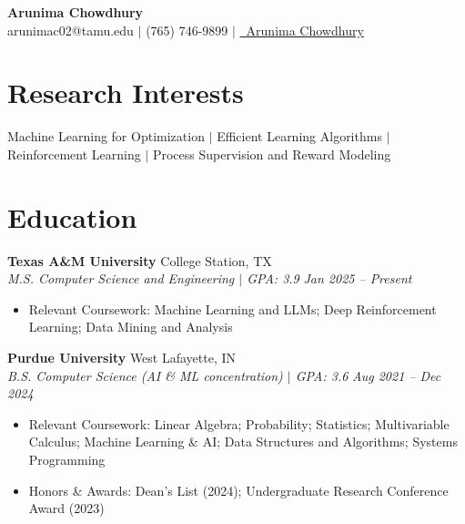 \documentclass[10pt,letterpaper]{article}
\newcommand{\heading}[4]{%
  \noindent\textbf{#1} \hfill #2\\
  \textit{#3} \hfill \textit{#4}\par
}
\begin{document}

\begin{center}
  {\Large \textbf{Arunima Chowdhury}}\\[2pt]
  arunimac02@tamu.edu $|$ (765) 746-9899 $|$
  \href{https://linkedin.com/in/arunima-chowdhury}{\faLinkedin\ Arunima Chowdhury}
\end{center}
\vspace{-8pt}


\section{Research Interests}
Machine Learning for Optimization $|$ Efficient Learning Algorithms $|$ Reinforcement Learning $|$ Process Supervision and Reward Modeling

\section{Education}

\heading{Texas A\&M University}{College Station, TX}{M.S. Computer Science and Engineering $|$ GPA: 3.9}{Jan 2025 -- Present}
\begin{itemize}
    \item Relevant Coursework: Machine Learning and LLMs; Deep Reinforcement Learning; Data Mining and Analysis
\end{itemize}

\heading{Purdue University}{West Lafayette, IN}{B.S. Computer Science (AI \& ML concentration) $|$ GPA: 3.6}{Aug 2021 -- Dec 2024}
\begin{itemize}
\item Relevant Coursework: Linear Algebra; Probability; Statistics; Multivariable Calculus; Machine Learning \& AI; Data Structures and Algorithms; Systems Programming
  \item Honors \& Awards: Dean's List (2024); Undergraduate Research Conference Award (2023)
\end{itemize}
\end{document}
